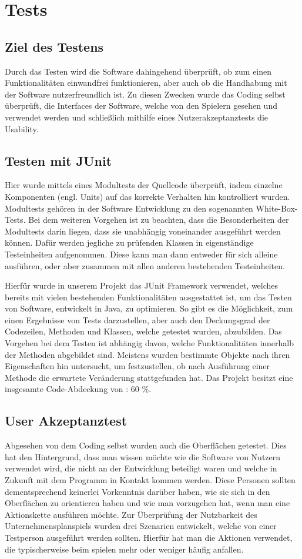 \chapter{Tests}
\section{Ziel des Testens}
Durch das Testen wird die Software dahingehend überprüft, ob zum einen Funktionalitäten einwandfrei funktionieren, aber auch ob die Handhabung mit der Software nutzerfreundlich ist.
Zu diesen Zwecken wurde das Coding selbst überprüft, die Interfaces der Software, welche von den Spielern gesehen und verwendet werden und schließlich mithilfe eines Nutzerakzeptanztests die Usability.
\section{Testen mit JUnit}
Hier wurde mittels eines Modultests der Quellcode überprüft, indem einzelne Komponenten (engl. Units) auf das korrekte Verhalten hin kontrolliert wurden. Modultests gehören in der Software Entwicklung zu den sogenannten White-Box-Tests. Bei dem weiteren Vorgehen ist zu beachten, dass die Besonderheiten der Modultests darin liegen, dass sie unabhängig voneinander ausgeführt werden können.
Dafür werden jegliche zu prüfenden Klassen in eigenständige Testeinheiten aufgenommen. Diese kann man dann entweder für sich alleine ausführen, oder aber zusammen mit allen anderen bestehenden Testeinheiten.

Hierfür wurde in unserem Projekt das JUnit Framework verwendet, welches bereits mit vielen bestehenden Funktionalitäten ausgestattet ist, um das Testen von Software, entwickelt in Java, zu optimieren. So gibt es die Möglichkeit, zum einen Ergebnisse von Tests darzustellen, aber auch den Deckungsgrad der Codezeilen, Methoden und Klassen, welche getestet wurden, abzubilden.
Das Vorgehen bei dem Testen ist abhängig davon, welche Funktionalitäten innerhalb der Methoden abgebildet sind. Meistens wurden bestimmte Objekte nach ihren Eigenschaften hin untersucht, um festzustellen, ob nach Ausführung einer Methode die erwartete Veränderung stattgefunden hat.
Das Projekt besitzt eine insgesamte Code-Abdeckung von : 60 \%.

\section{User Akzeptanztest}
Abgesehen von dem Coding selbst wurden auch die Oberflächen getestet. Dies hat den Hintergrund, dass man wissen möchte wie die Software von Nutzern verwendet wird, die nicht an der Entwicklung beteiligt waren und welche in Zukunft mit dem Programm in Kontakt kommen werden.
Diese Personen sollten dementsprechend keinerlei Vorkenntnis darüber haben, wie sie sich in den Oberflächen zu orientieren haben und wie man vorzugehen hat, wenn man eine Aktionskette ausführen möchte. Zur Überprüfung der Nutzbarkeit des Unternehmensplanspiels wurden drei Szenarien entwickelt, welche von einer Testperson ausgeführt werden sollten.
Hierfür hat man die Aktionen verwendet, die typischerweise beim spielen mehr oder weniger häufig anfallen.

